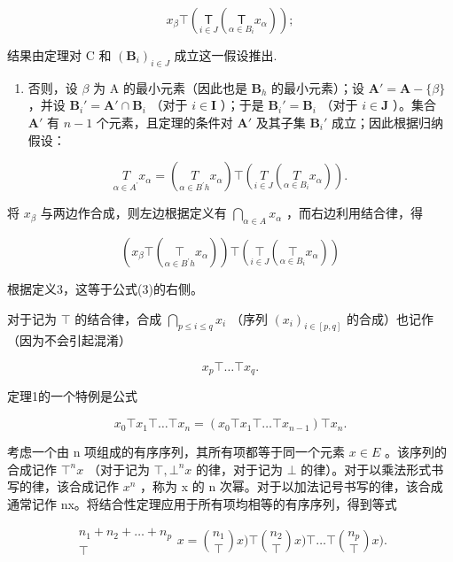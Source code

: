 \[
x _ {\beta} \top \left(\underset {i \in J} {\mathsf {T}} \left(\underset {\alpha \in B _ {i}} {\mathsf {T}} x _ {\alpha}\right)\right);
\]

结果由定理对 C 和 \((\mathbf{B}_{i})_{i\in J}\) 成立这一假设推出.

\begin{enumerate}
\def\labelenumi{(\alph{enumi})}
\setcounter{enumi}{1}
\tightlist
\item
  否则，设 \(\beta\) 为 A 的最小元素（因此也是 \(\mathbf{B}_h\) 的最小元素）；设 \(\mathbf{A}' = \mathbf{A} - \{\beta\}\) ，并设 \(\mathbf{B}_i' = \mathbf{A}' \cap \mathbf{B}_i\) （对于 \(i \in \mathbf{I}\) ）；于是 \(\mathbf{B}_i' = \mathbf{B}_i\) （对于 \(i \in \mathbf{J}\) ）。集合 \(\mathbf{A}'\) 有 \(n - 1\) 个元素，且定理的条件对 \(\mathbf{A}'\) 及其子集 \(\mathbf{B}_i'\) 成立；因此根据归纳假设：
\end{enumerate}

\[
\underset {\alpha \in A ^ {\prime}} {T} x _ {\alpha} = \left(\underset {\alpha \in B ^ {\prime} h} {T} x _ {\alpha}\right) \top \left(\underset {i \in J} {T} \left(\underset {\alpha \in B _ {i}} {T} x _ {\alpha}\right)\right).
\]

将 \(x_{\beta}\) 与两边作合成，则左边根据定义有 \(\bigcap_{\alpha \in A} x_{\alpha}\) ，而右边利用结合律，得

\[
\left(x _ {\beta} \top \left(\underset {\alpha \in B ^ {\prime} h} {\top} x _ {\alpha}\right)\right) \top \left(\underset {i \in J} {\top} \left(\underset {\alpha \in B _ {i}} {\top} x _ {\alpha}\right)\right)
\]

根据定义3，这等于公式(3)的右侧。

对于记为 \(\top\) 的结合律，合成 \(\bigcap_{p\leqslant i\leqslant q}x_i\) （序列 \((x_i)_{i\in [p,q]}\) 的合成）也记作（因为不会引起混淆）

\[
x _ {p} \top \dots \top x _ {q}.
\]

定理1的一个特例是公式

\[
x _ {0} \top x _ {1} \top \dots \top x _ {n} = (x _ {0} \top x _ {1} \top \dots \top x _ {n - 1}) \top x _ {n}.
\]

考虑一个由 n 项组成的有序序列，其所有项都等于同一个元素 \(x \in E\) 。该序列的合成记作 \(\top^{n} x\) （对于记为 \(\top, \bot^{n} x\) 的律，对于记为 \(\bot\) 的律）。对于以乘法形式书写的律，该合成记作 \(x^{n}\) ，称为 x 的 n 次幂。对于以加法记号书写的律，该合成通常记作 nx。将结合性定理应用于所有项均相等的有序序列，得到等式

\[
\begin{array}{c} n _ {1} + n _ {2} + \dots + n _ {p} \\ \top \end{array} x = \binom {n _ {1}} {\top} x) \top \binom {n _ {2}} {\top} x) \top \dots \top \binom {n _ {p}} {\top} x).
\]


